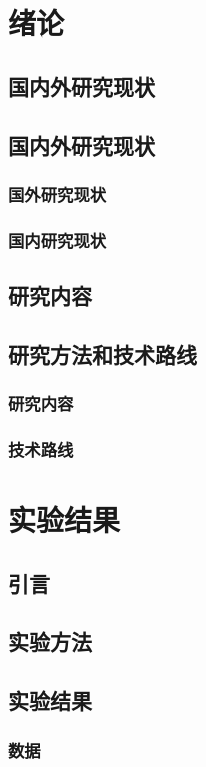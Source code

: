 \documentclass{ctexbook}
\begin{document}
    \tableofcontents

    \chapter{绪论}
    \section{国内外研究现状}
    \section{国内外研究现状}
    \subsection{国外研究现状}
    \subsection{国内研究现状}
    \section{研究内容}
    \section{研究方法和技术路线}
    \subsection{研究内容}
    \subsection{技术路线}

    \chapter{实验结果}
    \section{引言}
    \section{实验方法}
    \section{实验结果}
    \subsection{数据}
\end{document}
